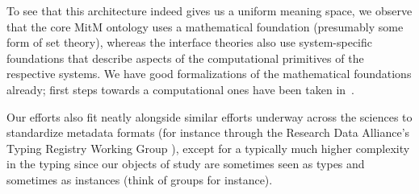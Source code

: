 To see that this architecture indeed gives us a uniform meaning space, we observe that the
core MitM ontology uses a mathematical foundation (presumably some form of set theory),
whereas the interface theories also use system-specific foundations that describe aspects
of the computational primitives of the respective systems. We have good formalizations of
the mathematical foundations already; first steps towards a computational ones have been
taken in~\cite{KohManRab:aumftg13}.

Our efforts also fit neatly alongside similar efforts underway across the sciences to
standardize metadata formats (for instance through the Research Data Alliance's Typing
Registry Working Group \cite{rda-typing}), except for a typically much higher complexity
in the typing since our objects of study are sometimes seen as types and
sometimes as instances (think of groups for instance).



